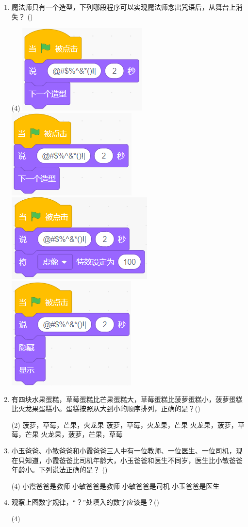 \documentclass[10pt, a4paper]{article}
\newcommand{\hq}{\hfill(\qquad)}
\begin{document}
\begin{enumerate}
        \item 魔法师只有一个造型，下列哪段程序可以实现魔法师念出咒语后，从舞台上消失？ \hq
        \begin{tasks}(4)
            \task \includegraphics[width=.18\textwidth]{figure/3a.png}
            \task \includegraphics[width=.18\textwidth]{figure/3b.png}
            \task \includegraphics[width=.18\textwidth]{figure/3c.png}
            \task \includegraphics[width=.15\textwidth]{figure/3d.png}
        \end{tasks}

        \item 有四块水果蛋糕，草莓蛋糕比芒果蛋糕大，草莓蛋糕比菠萝蛋糕小，菠萝蛋糕比火龙果蛋糕小。蛋糕按照从大到小的顺序排列，正确的是？\hq
        \begin{tasks}(2)
            \task 菠萝，草莓，芒果，火龙果
            \task 菠萝，草莓，火龙果，芒果
            \task 火龙果，菠萝，草莓，芒果
            \task 火龙果，菠萝，芒果，草莓
        \end{tasks}

        \item 小玉爸爸、小敏爸爸和小霞爸爸三人中有一位教师、一位医生、一位司机，现在只知道，小霞爸爸比司机年龄大，小玉爸爸和医生不同岁，医生比小敏爸爸年龄小。下列说法正确的是？ \hq
        \begin{tasks}(4)
            \task 小霞爸爸是教师
            \task 小敏爸爸是教师
            \task 小敏爸爸是司机
            \task 小玉爸爸是医生
        \end{tasks}

        \item 观察上图数字规律，“？”处填入的数字应该是？\hq
        \begin{tasks}(4)
        \end{tasks}


\end{enumerate}
\end{document}
